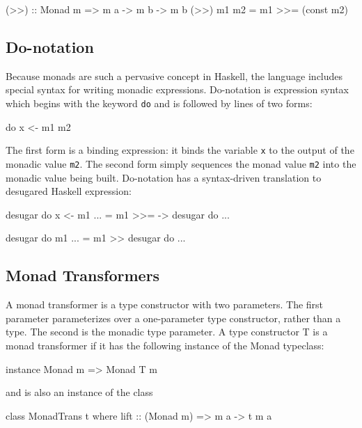 \begin{code}
(>>) :: Monad m => m a -> m b -> m b
(>>) m1 m2 = m1 >>= (const m2)

\subsection{Do-notation}
\label{subsection:Haskell_Concepts-Monads_and_Monad_Transformers-Do_notation}

Because monads are such a pervasive concept in Haskell, the language includes
special syntax for writing monadic expressions. Do-notation is expression syntax
which begins with the keyword {\tt do} and is followed by lines of two forms:

\begin{code}
do
  x <- m1
  m2
\end{code}

The first form is a binding expression: it binds the variable {\tt x} to the
output of the monadic value {\tt m2}. The second form simply sequences the monad
value {\tt m2} into the monadic value being built. Do-notation has a syntax-driven
translation to desugared Haskell expression:

\begin{code}
desugar {
do x <- m1
   ...} = 
m1 >>= \x -> desugar {do ...}

desugar {
do m1
   ...} =
m1 >> desugar {do ...}
\end{code}

\subsection{Monad Transformers}
\label{subsection:Haskell_Concepts-Monads_and_Monad_Transformers-Monad_Transformers}
A monad transformer is a type constructor with two parameters. The first
parameter parameterizes over a one-parameter type constructor, rather than a
type. The second is the monadic type parameter. A type constructor {T} is a monad
transformer if it has the following instance of the Monad typeclass:

\begin{code}
instance Monad m => Monad T m
\end{code}

and is also an instance of the class

\begin{code}
class MonadTrans t where
  lift :: (Monad m) => m a -> t m a
\end{code}


\end{code}
